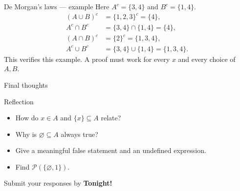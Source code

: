 \documentclass{beamer}
\newcommand{\pow}{\mathcal{P}}
\begin{document}
\begin{frame}{De Morgan's laws --- example}
Here $A^c=\{3,4\}$ and $B^c=\{1,4\}$.\[\begin{aligned}(A\cup B)^c&=\{1,2,3\}^c=\{4\},\\A^c\cap B^c&=\{3,4\}\cap\{1,4\}=\{4\},\\(A\cap B)^c&=\{2\}^c=\{1,3,4\},\\A^c\cup B^c&=\{3,4\}\cup\{1,4\}=\{1,3,4\}.\end{aligned}\]This verifies this example. A proof must work for every $x$ and every choice of $A,B$.
\end{frame}

\begin{frame}{Final thoughts}
  \begin{block}{Reflection}
\begin{itemize}
\item How do $x\in A$ and $\{x\}\subseteq A$ relate?
\item Why is $\varnothing\subseteq A$ always true?
\item Give a meaningful false statement and an undefined expression.
\item Find $\pow(\{\varnothing,1\})$.
\end{itemize}
  \end{block}
\begin{center}
Submit your responses by \textbf{Tonight!}
\end{center}
\end{frame}
\end{document}
